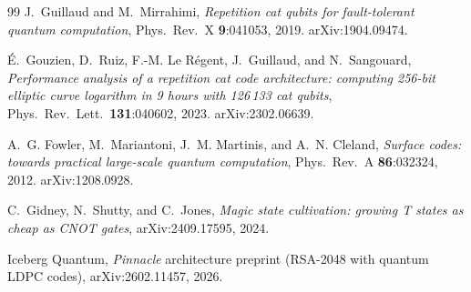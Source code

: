 \documentclass[11pt]{article}
\theoremstyle{plain}
\theoremstyle{remark}
\begin{document}
\begin{thebibliography}{99}
J.~Guillaud and M.~Mirrahimi,
\emph{Repetition cat qubits for fault-tolerant quantum computation},
Phys.\ Rev.\ X \textbf{9}:041053, 2019. arXiv:1904.09474.

\'E.~Gouzien, D.~Ruiz, F.-M. Le R\'egent, J.~Guillaud, and N.~Sangouard,
\emph{Performance analysis of a repetition cat code architecture: computing 256-bit elliptic
curve logarithm in 9 hours with 126\,133 cat qubits},
Phys.\ Rev.\ Lett.\ \textbf{131}:040602, 2023. arXiv:2302.06639.

A.~G. Fowler, M.~Mariantoni, J.~M. Martinis, and A.~N. Cleland,
\emph{Surface codes: towards practical large-scale quantum computation},
Phys.\ Rev.\ A \textbf{86}:032324, 2012. arXiv:1208.0928.

C.~Gidney, N.~Shutty, and C.~Jones,
\emph{Magic state cultivation: growing T states as cheap as CNOT gates},
arXiv:2409.17595, 2024.

Iceberg Quantum,
\emph{Pinnacle} architecture preprint (RSA-2048 with quantum LDPC codes),
arXiv:2602.11457, 2026.

\end{thebibliography}
\end{document}
